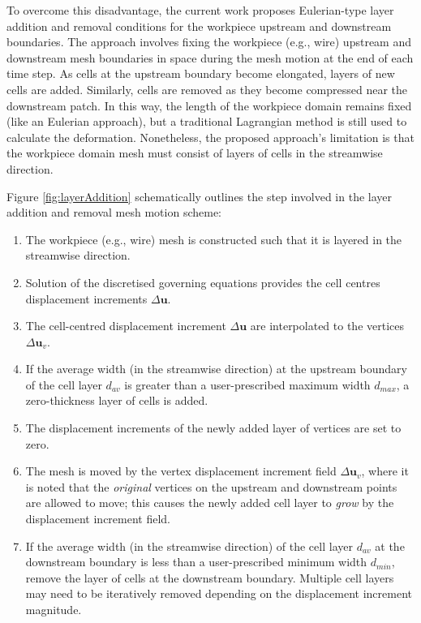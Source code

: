 \documentclass[sn-mathphys,Numbered]{sn-jnl}%
\newcommand{\bb}{\boldsymbol}
\begin{document}
To overcome this disadvantage, the current work proposes Eulerian-type layer addition and removal conditions for the workpiece upstream and downstream boundaries.
The approach involves fixing the workpiece (e.g., wire) upstream and downstream mesh boundaries in space during the mesh motion at the end of each time step.
As cells at the upstream boundary become elongated, layers of new cells are added.
Similarly, cells are removed as they become compressed near the downstream patch.
In this way, the length of the workpiece domain remains fixed (like an Eulerian approach), but a traditional Lagrangian method is still used to calculate the deformation.
Nonetheless, the proposed approach's limitation is that the workpiece domain mesh must consist of layers of cells in the streamwise direction.

Figure \ref{fig:layerAddition} schematically outlines the step involved in the layer addition and removal mesh motion scheme:
\begin{enumerate}[label=(\alph*)]
	\item The workpiece (e.g., wire) mesh is constructed such that it is layered in the streamwise direction.
	\item Solution of the discretised governing equations provides the cell centres displacement increments $\Delta \bb{u}$.
	\item The cell-centred displacement increment $\Delta \bb{u}$ are interpolated to the vertices $\Delta \bb{u}_v$.
	\item If the average width (in the streamwise direction) at the upstream boundary of the cell layer $d_{av}$ is greater than a user-prescribed maximum width $d_{max}$, a zero-thickness layer of cells is added.
	\item The displacement increments of the newly added layer of vertices are set to zero.
	\item The mesh is moved by the vertex displacement increment field $\Delta \bb{u}_v$, where it is noted that the \emph{original} vertices on the upstream and downstream points are allowed to move; this causes the newly added cell layer to \emph{grow} by the displacement increment field. 
	\item If the average width (in the streamwise direction) of the cell layer $d_{av}$ at the downstream boundary is less than a user-prescribed minimum width $d_{min}$, remove the layer of cells at the downstream boundary. Multiple cell layers may need to be iteratively removed depending on the displacement increment magnitude.
\end{enumerate}
\end{document}
